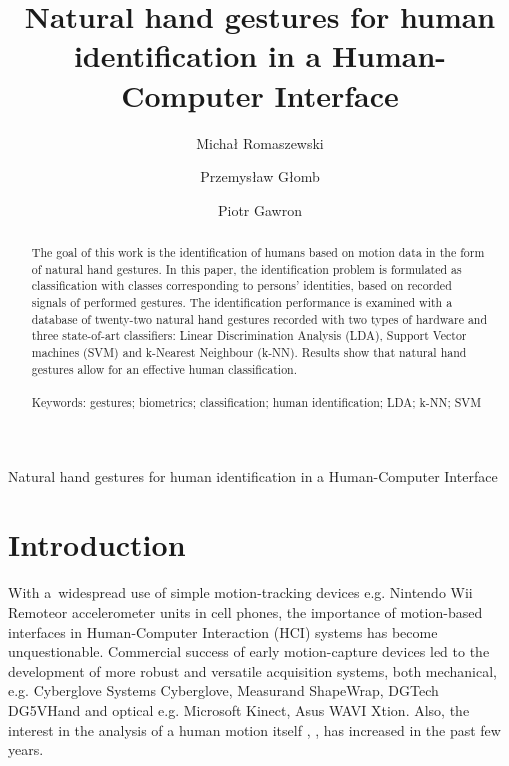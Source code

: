 \documentclass[]{article}
\begin{document}
{Natural hand gestures for human identification in a Human-Computer Interface}


\title{Natural hand gestures for human identification in a Human-Computer Interface}

\author{Micha{\l} Romaszewski}
\author{Przemys{\l}aw G{\l}omb}
\author{Piotr Gawron}
\maketitle

\begin{abstract}
The goal of this work is the identification of humans based on motion data in
the form of natural hand gestures. In this paper, the identification problem is
formulated as classification with classes corresponding to persons' identities,
based on recorded signals of performed gestures. The identification performance
is examined with a database of twenty-two natural hand gestures recorded with
two types of hardware and three state-of-art classifiers: Linear Discrimination
Analysis (LDA), Support Vector machines (SVM) and k-Nearest Neighbour (k-NN).
Results show that natural hand gestures allow for an effective human
classification. 
\\
\\
\noindent Keywords:
gestures; biometrics; classification; human identification; LDA; k-NN; SVM 
\end{abstract}


\section{Introduction}
With a~widespread use of simple motion-tracking devices e.g. Nintendo Wii
Remote\texttrademark or accelerometer units in cell phones, the importance of
motion-based interfaces in Human-Computer Interaction (HCI) systems has become
unquestionable. Commercial success of early motion-capture devices led to the
development of more robust and versatile acquisition systems, both mechanical,
e.g. Cyberglove Systems Cyberglove\texttrademark,  Measurand
ShapeWrap\texttrademark, DGTech DG5VHand\texttrademark{} and optical  e.g.
Microsoft Kinect\texttrademark, Asus WAVI Xtion\texttrademark.  Also, the
interest in the analysis of a human motion itself 
\cite{McNeill:1992}, \cite{Quek:2002}, \cite{BergmannKopp:2010} 
has increased in the past few years.
\end{document}
